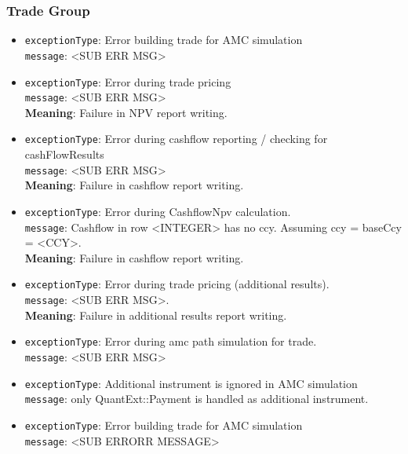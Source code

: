 \subsubsection*{Trade Group}

\begin{itemize}

  \item \lstinline!exceptionType!: Error building trade for AMC simulation \\
        \lstinline!message!: <SUB ERR MSG>

  \item \lstinline!exceptionType!: Error during trade pricing \\
        \lstinline!message!: <SUB ERR MSG> \\
        \textbf{Meaning}: Failure in NPV report writing.

  \item \lstinline!exceptionType!: Error during cashflow reporting / checking for cashFlowResults \\
        \lstinline!message!: <SUB ERR MSG> \\
        \textbf{Meaning}: Failure in cashflow report writing.

  \item \lstinline!exceptionType!: Error during CashflowNpv calculation. \\
        \lstinline!message!: Cashflow in row <INTEGER> has no ccy. Assuming ccy = baseCcy = <CCY>. \\
        \textbf{Meaning}: Failure in cashflow report writing.

  \item \lstinline!exceptionType!: Error during trade pricing (additional results). \\
        \lstinline!message!: <SUB ERR MSG>. \\
        \textbf{Meaning}: Failure in additional results report writing.

  \item \lstinline!exceptionType!: Error during amc path simulation for trade. \\
        \lstinline!message!: <SUB ERR MSG>

  \item \lstinline!exceptionType!: Additional instrument is ignored in AMC simulation \\
        \lstinline!message!: only QuantExt::Payment is handled as additional instrument.

  \item \lstinline!exceptionType!: Error building trade for AMC simulation \\
        \lstinline!message!: <SUB ERRORR MESSAGE>


\end{itemize}
